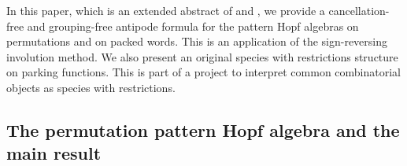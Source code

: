 \documentclass[submission]{FPSAC2023}
\theoremstyle{definition}
\DeclareMathOperator{\pat}{\mathbf{pat}}
\begin{document}
In this paper, which is an extended abstract of \cite{PV2022} and \cite{penaguiao2023polynomial}, we provide a cancellation-free and grouping-free antipode formula for the pattern Hopf algebras on permutations and on packed words.
This is an application of the sign-reversing involution method. We also present an original species with restrictions structure on parking functions.
This is part of a project to interpret common combinatorial objects as species with restrictions.


\subsection{The permutation pattern Hopf algebra and the main result}


\end{document}

